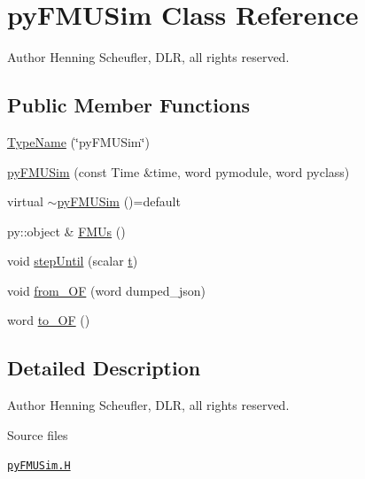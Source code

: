 \hypertarget{classFoam_1_1pyFMUSim}{}\section{py\+F\+M\+U\+Sim Class Reference}
\label{classFoam_1_1pyFMUSim}


Author Henning Scheufler, D\+LR, all rights reserved.  


\subsection*{Public Member Functions}
\begin{DoxyCompactItemize}
\item 
\hyperlink{classFoam_1_1pyFMUSim_aa9cca774047c6dea4f8cbc228d4965ad}{Type\+Name} (\char`\"{}py\+F\+M\+U\+Sim\char`\"{})
\item 
\hyperlink{classFoam_1_1pyFMUSim_a593c04dc8c1b5a19575a3a4f84176d6a}{py\+F\+M\+U\+Sim} (const Time \&time, word pymodule, word pyclass)
\item 
virtual \hyperlink{classFoam_1_1pyFMUSim_a60a90e4b802011109dc4ff17b12b54a0}{$\sim$py\+F\+M\+U\+Sim} ()=default
\item 
py\+::object \& \hyperlink{classFoam_1_1pyFMUSim_aeb31c786a30f052e3d236b6bbea36f66}{F\+M\+Us} ()
\item 
void \hyperlink{classFoam_1_1pyFMUSim_a6b850002ddd6a28e773a0a0e7d6f9f74}{step\+Until} (scalar \hyperlink{correctReactivity_8H_af8e30ff2e3fe21800ba55c8d7534a828}{t})
\item 
void \hyperlink{classFoam_1_1pyFMUSim_a3d006b21bef4f156262bd22b275114cb}{from\+\_\+\+OF} (word dumped\+\_\+json)
\item 
word \hyperlink{classFoam_1_1pyFMUSim_a90f2502f325075b4b2a10a9be24f1673}{to\+\_\+\+OF} ()
\end{DoxyCompactItemize}


\subsection{Detailed Description}
Author Henning Scheufler, D\+LR, all rights reserved. 

\label{_Description}%
 \begin{DoxyParagraph}{Source files}

\begin{DoxyItemize}
\item \href{../../../home/carlo/data/GeN-Foam/GeN-Foam_ffn/GeN-Foam/GeN-Foam/FMU4FOAM/src/OF_FMU/pyFMUSim/pyFMUSim.H}{\tt py\+F\+M\+U\+Sim.\+H} 
\end{DoxyItemize}
\end{DoxyParagraph}


